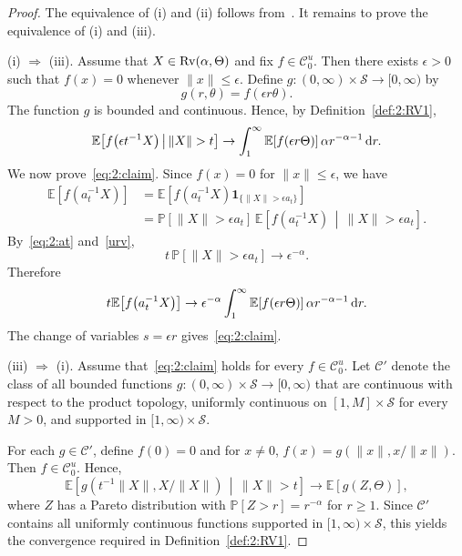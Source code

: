 \documentclass[preprint,12pt]{elsarticle}
\theoremstyle{definition}
\theoremstyle{remark}
\newcommand{\xbf}{{ x}}
\newcommand{\Xbf}{{ X}}
\newcommand{\1}{{\mathbf 1}}
\numberwithin{equation}{section}
\newcommand{\Ebb}{\mathbb{E}}  %
\newcommand{\Pbb}{\mathbb{P}}
\newcommand{\ud}{{\rm d}}
\newcommand{\Rvrm}{{\rm Rv}}
\newcommand{\Scal}{\mathcal{S}}
\newcommand{\Ccal}{\mathcal{C}}
\begin{document}
  \begin{proof}
    The equivalence of (i) and (ii) follows from~\cite[Proposition~3.1]{segers2017polar}. 
    It remains to prove the equivalence of (i) and (iii).

    \medskip
    \noindent
    (i) $\Rightarrow$ (iii).
    Assume that $\Xbf \in \Rvrm(\alpha,\Theta)$ and fix $f\in\Ccal_0^u$. 
    Then there exists $\epsilon>0$ such that $f(\xbf)=0$ whenever $\|\xbf\|\le\epsilon$. 
    Define $g\colon (0,\infty)\times\Scal\to[0,\infty)$ by
    \[
		g(r,\theta)=f(\epsilon r\theta).
    \]
    The function $g$ is bounded and continuous. Hence, by Definition~\ref{def:2:RV1},
    \[
		\Ebb\!\left[f\!\left(\epsilon t^{-1}\Xbf\right)\,\middle|\,\|\Xbf\|>t\right]
		\to \int_1^\infty \Ebb\!\left[f(\epsilon r\Theta)\right]\alpha r^{-\alpha-1}\,\ud r.
    \]
    We now prove~\eqref{eq:2:claim}. Since $f(\xbf)=0$ for $\|\xbf\|\le \epsilon$, we have
    \begin{align*}
	   \Ebb\!\left[f\!\left(a_t^{-1}\Xbf\right)\right]
	   & = \Ebb\!\left[f\!\left(a_t^{-1}\Xbf\right)\mathbf{1}_{\{\|\Xbf\|>\epsilon a_t\}}\right]\\
	   & = \Pbb[\|\Xbf\|>\epsilon a_t]\,
	   \Ebb\!\left[f\!\left(a_t^{-1}\Xbf\right)\,\middle|\,\|\Xbf\|>\epsilon a_t\right].
    \end{align*}
    By~\eqref{eq:2:at} and~\eqref{urv},
    \[
	   t\,\Pbb[\|\Xbf\|>\epsilon a_t]
	   \to \epsilon^{-\alpha}.
    \]
    Therefore
    \[
	   t\Ebb\!\left[f\!\left( a_t^{-1}\Xbf\right)\right]
	   \to \epsilon^{-\alpha} \int_1^\infty \Ebb\!\left[f(\epsilon r\Theta)\right]\alpha r^{-\alpha-1}\,\ud r.
    \]
    The change of variables $s=\epsilon r$ gives~\eqref{eq:2:claim}.

    \medskip
    \noindent
    (iii) $\Rightarrow$ (i).
    Assume that~\eqref{eq:2:claim} holds for every $f\in\Ccal_0^u$. 
    Let $\Ccal'$ denote the class of all bounded functions
    $g\colon (0,\infty)\times\Scal\to[0,\infty)$ that are continuous with respect to the product topology,
    uniformly continuous on $[1,M]\times\Scal$ for every $M>0$, 
    and supported in $[1,\infty)\times\Scal$.

    For each $g\in\Ccal'$, define $f(0)=0$ and for $x \neq 0$,
    $f(\xbf)=g(\|\xbf\|,\xbf/\|\xbf\|)$.
    Then $f\in\Ccal_0^u$. Hence,
    \[
		\Ebb\!\left[g\!\left(t^{-1}\|\Xbf\|,\Xbf/\|\Xbf\|\right)
		\,\middle|\,\|\Xbf\|>t\right]
		\to \Ebb[g(Z,\Theta)],
    \]
    where $Z$ has a Pareto distribution with $\Pbb[Z>r]=r^{-\alpha}$ for $r\ge1$. 
    Since $\Ccal'$ contains all uniformly continuous functions supported in 
    $[1,\infty)\times\Scal$, this yields the convergence required in Definition~\ref{def:2:RV1}.
  \end{proof}
\end{document}
